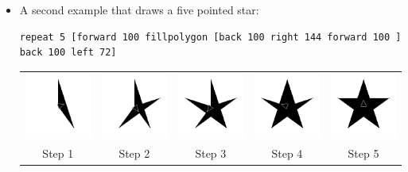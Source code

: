 \begin{itemize}
\begin{center}
\end{center}
\item A second example that draws a five pointed star:
\begin{verbatim}
repeat 5 [forward 100 fillpolygon [back 100 right 144 forward 100 ] back 100 left 72]
\end{verbatim}
\begin{center}
 \begin{tabular}{ccccc}
 \includegraphics[width=3cm]{pics/fillpolygon1.png}& \includegraphics[width=3cm]{pics/fillpolygon2.png}& \includegraphics[width=3cm]{pics/fillpolygon3.png}& \includegraphics[width=3cm]{pics/fillpolygon4.png}& \includegraphics[width=3cm]{pics/fillpolygon5.png}\\
Step 1& Step 2& Step 3& Step 4&Step 5\\
\end{tabular}
\end{center}
\end{itemize}
